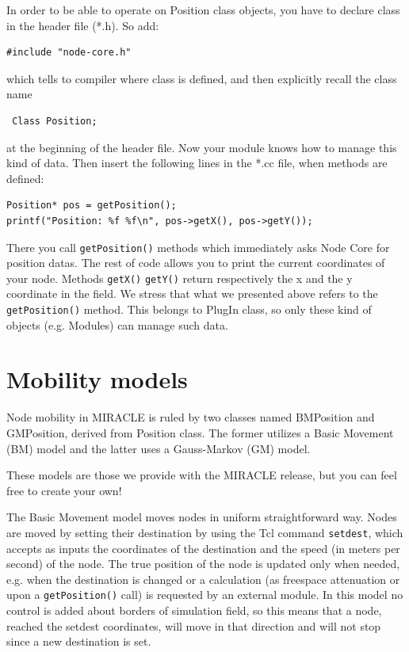 \documentclass[a4paper,10pt]{article}
\begin{document}
In order to be able to operate on Position class objects, you have to declare class in the header file (*.h). So add:
\begin{verbatim}
#include "node-core.h"
\end{verbatim}
which tells to compiler where class is defined, and then explicitly recall the class name
\begin{verbatim}
 Class Position;
\end{verbatim}
at the beginning of the header file. Now your module knows how to manage this kind of data. Then insert the following lines in the *.cc file, when methods are defined:

\begin{verbatim}
Position* pos = getPosition();
printf("Position: %f %f\n", pos->getX(), pos->getY());
\end{verbatim}
There you call \verb=getPosition()= methods which immediately asks Node Core for position datas.
The rest of code allows you to print the current coordinates of your node. Methods \verb=getX()= \verb=getY()= return respectively the x and the y coordinate in the field.
We stress that what we presented above refers to the \verb=getPosition()= method. This belongs to PlugIn class, so only these kind of objects (e.g. Modules) can manage such data.

\section{Mobility models}
Node mobility in MIRACLE is ruled by two classes named BMPosition and GMPosition, derived from Position class. The former utilizes a Basic Movement (BM) model and the latter uses a Gauss-Markov (GM) model.

These models are those we provide with the MIRACLE release, but you can feel free to create your own!

The Basic Movement model moves nodes in uniform straightforward way. Nodes are moved by setting their destination by using the Tcl command \verb=setdest=, which accepts as inputs the coordinates of the destination and the speed (in meters per second) of the node. The true position of the node is updated only when needed, e.g. when the destination is changed or a calculation (as freespace attenuation or upon a \verb=getPosition()= call) is requested by an external module. In this model no control is added about borders of simulation field, so this means that a node, reached the setdest coordinates, will move in that direction and will not stop since a new destination is set.
\end{document}
